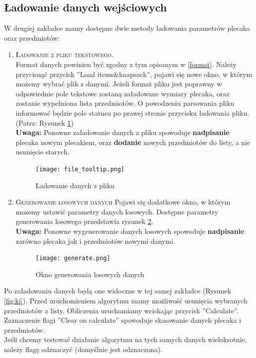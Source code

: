 \documentclass[a4paper,12pt,notitlepage]{mwrep}
\begin{document}
\subsection{Ładowanie danych wejściowych}
W drugiej zakładce mamy dostępne dwie metody ładowania parametrów plecaka oraz przedmiotów:
\begin{enumerate}
	\item	\textsc{Ładowanie z pliku tekstowego}.\\
			Format danych powinien być zgodny z tym opisanym w \ref{format}.
			Należy przycisnąć przycisk ''Load items\&knapsack'', pojawi się nowe okno, w którym możemy wybrać plik z danymi.
			Jeżeli format pliku jest poprawny w odpowiednie pole tekstowe zostaną załadowane wymiary plecaka,
			oraz zostanie wypełniona lista przedmiotów.
			O powodzeniu parsowania pliku informować będzie pole statusu po prawej stronie przycisku ładowania pliku.
			(Patrz: Rysunek \ref{fig:load})\\
			\textbf{Uwaga:} Ponowne załadowanie danych z pliku spowoduje \textbf{nadpisanie} plecaka nowym plecakiem,
			oraz \textbf{dodanie} nowych przedmiotów do listy, a nie usunięcie starych.
			\begin{figure}[H]
			\centering
			\texttt{[image: file\_tooltip.png]}
			\caption{Ładowanie danych z pliku}
			\label{fig:load}
			\end{figure}
	\item	\textsc{Generowanie losowych danych}
			Pojawi się dodatkowe okno, w którym mozemy ustawić parametry danych losowych.
			Dostępne parametry generowania losowego przedstawia rysunek \ref{fig:generate}.\\
			\textbf{Uwaga:} Ponowne wygenerowanie danych losowych spowoduje \textbf{nadpisanie}
			zarówno plecaka jak i przedmiotów nowymi danymi.
			\begin{figure}[H]
			\centering
			\texttt{[image: generate.png]}
			\caption{Okno generowania losowych danych}
			\label{fig:generate}
			\end{figure}
\end{enumerate}
Po załadowaniu danych będą one widoczne w tej samej zakładce (Rysunek \ref{fig:ki}).
Przed uruchomieniem algorytmu mamy możliwość usunięcia wybranych przedmiotów z listy.
Obliczenia uruchamiamy wciskając przycisk ''Calculate''.
Zaznaczenie flagi ''Clear on calculate'' spowoduje skasowanie danych plecaka i przedmiotów.\\
Jeśli chcemy testować działanie algorytmu na tych samych danych wielokrotnie,
należy flagę odznaczyć (domyślnie jest odznaczona).
\end{document}
